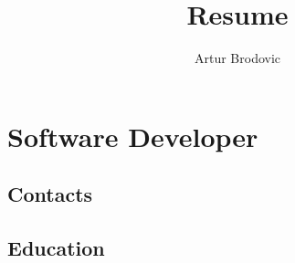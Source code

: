 \documentclass{article}
\begin{document}
\title{Resume}
\author{Artur Brodovic}
\maketitle

\section{Software Developer}

\subsection{Contacts}

\subsection{Education}
\end{document}
